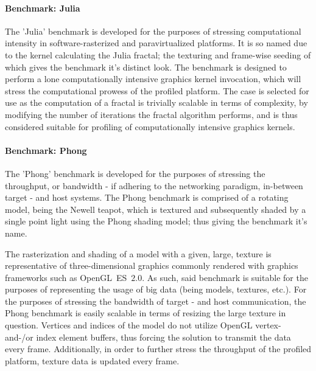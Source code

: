 \paragraph{Benchmark: Julia}
\label{par:experimentalmethodology_benchmarking_benchmarkjulia}
The 'Julia' benchmark is developed for the purposes of stressing computational intensity in software-rasterized and paravirtualized platforms.
It is so named due to the kernel calculating the Julia fractal; the texturing and frame-wise seeding of which gives the benchmark it's distinct look.
The benchmark is designed to perform a lone computationally intensive graphics kernel invocation, which will stress the computational prowess of the profiled platform.
The case is selected for use as the computation of a fractal is trivially scalable in terms of complexity, by modifying the number of iterations the fractal algorithm performs, and is thus considered suitable for profiling of computationally intensive graphics kernels.

\paragraph{Benchmark: Phong}
\label{par:experimentalmethodology_benchmarking_benchmarkphong}
The 'Phong' benchmark is developed for the purposes of stressing the throughput, or bandwidth - if adhering to the networking paradigm, in-between target - and host systems.
The Phong benchmark is comprised of a rotating model, being the Newell teapot, which is textured and subsequently shaded by a single point light using the Phong shading model; thus giving the benchmark it's name. %

The rasterization and shading of a model with a given, large, texture is representative of three-dimensional graphics commonly rendered with graphics frameworks such as OpenGL~ES~$2.0$.
As such, said benchmark is suitable for the purposes of representing the usage of big data (being models, textures, etc.).
For the purposes of stressing the bandwidth of target - and host communication, the Phong benchmark is easily scalable in terms of resizing the large texture in question.
Vertices and indices of the model do not utilize OpenGL vertex- and-/or index element buffers, thus forcing the solution to transmit the data every frame.
Additionally, in order to further stress the throughput of the profiled platform, texture data is updated every frame.


